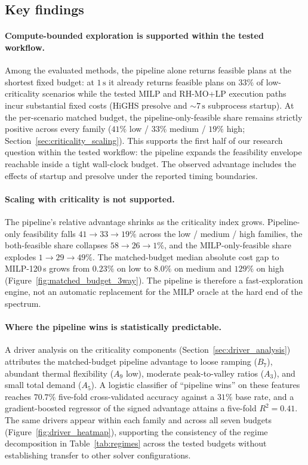 \documentclass{article}
\begin{document}
\subsection{Key findings}
\label{sec:key_findings}

\paragraph{Compute-bounded exploration is supported within the tested workflow.}
Among the evaluated methods, the pipeline alone returns feasible plans at the shortest fixed budget: at $1\,\mathrm{s}$ it already returns feasible plans on $33\%$ of low-criticality scenarios while the tested MILP and RH-MO+LP execution paths incur substantial fixed costs (HiGHS presolve and $\sim 7\,\mathrm{s}$ subprocess startup). At the per-scenario matched budget, the pipeline-only-feasible share remains strictly positive across every family ($41\%$ low / $33\%$ medium / $19\%$ high; Section~\ref{sec:criticality_scaling}). This supports the first half of our research question within the tested workflow: the pipeline expands the feasibility envelope reachable inside a tight wall-clock budget. The observed advantage includes the effects of startup and presolve under the reported timing boundaries.

\paragraph{Scaling with criticality is not supported.}
The pipeline's relative advantage shrinks as the criticality index grows. Pipeline-only feasibility falls $41 \to 33 \to 19\%$ across the low / medium / high families, the both-feasible share collapses $58 \to 26 \to 1\%$, and the MILP-only-feasible share explodes $1 \to 29 \to 49\%$. The matched-budget median absolute cost gap to MILP-120\,s grows from $0.23\%$ on low to $8.0\%$ on medium and $129\%$ on high (Figure~\ref{fig:matched_budget_3way}). The pipeline is therefore a fast-exploration engine, not an automatic replacement for the MILP oracle at the hard end of the spectrum.

\paragraph{Where the pipeline wins is statistically predictable.}
A driver analysis on the criticality components (Section~\ref{sec:driver_analysis}) attributes the matched-budget pipeline advantage to loose ramping ($B_7$), abundant thermal flexibility ($A_9$ low), moderate peak-to-valley ratios ($A_3$), and small total demand ($A_5$). A logistic classifier of ``pipeline wins'' on these features reaches $70.7\%$ five-fold cross-validated accuracy against a $31\%$ base rate, and a gradient-boosted regressor of the signed advantage attains a five-fold $R^2 = 0.41$. The same drivers appear within each family and across all seven budgets (Figure~\ref{fig:driver_heatmap}), supporting the consistency of the regime decomposition in Table~\ref{tab:regimes} across the tested budgets without establishing transfer to other solver configurations.
\end{document}
